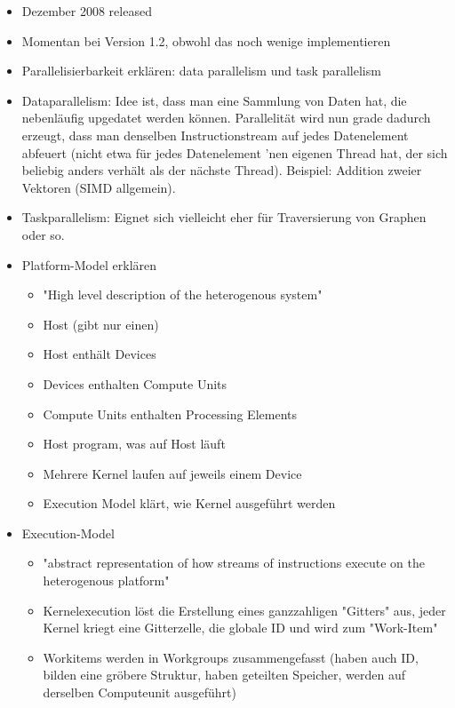 \begin{itemize}
\item Dezember 2008 released
\item Momentan bei Version 1.2, obwohl das noch wenige implementieren
\end{itemize}

\begin{itemize}
\item Parallelisierbarkeit erklären: data parallelism und task parallelism
\item Dataparallelism: Idee ist, dass man eine Sammlung von Daten hat, die
nebenläufig upgedatet werden können. Parallelität wird nun grade dadurch
erzeugt, dass man denselben Instructionstream auf jedes Datenelement abfeuert
(nicht etwa für jedes Datenelement 'nen eigenen Thread hat, der sich beliebig
 anders verhält als der nächste Thread). Beispiel: Addition zweier Vektoren
(SIMD allgemein).
\item Taskparallelism: Eignet sich vielleicht eher für Traversierung von Graphen
oder so.
\item Platform-Model erklären
	\begin{itemize}
		\item "High level description of the heterogenous system"
		\item Host (gibt nur einen)
		\item Host enthält Devices
		\item Devices enthalten Compute Units
		\item Compute Units enthalten Processing Elements
		\item Host program, was auf Host läuft
		\item Mehrere Kernel laufen auf jeweils einem Device
		\item Execution Model klärt, wie Kernel ausgeführt werden
	\end{itemize}
\item Execution-Model
	\begin{itemize}
		\item "abstract representation of how streams of instructions execute on the heterogenous platform"
		\item Kernelexecution löst die Erstellung eines ganzzahligen "Gitters" aus, jeder Kernel kriegt eine Gitterzelle, die globale ID und wird zum "Work-Item"
		\item Workitems werden in Workgroups zusammengefasst (haben auch ID, bilden eine gröbere Struktur, haben geteilten Speicher, werden auf derselben Computeunit ausgeführt)

\end{itemize}
\end{itemize}
